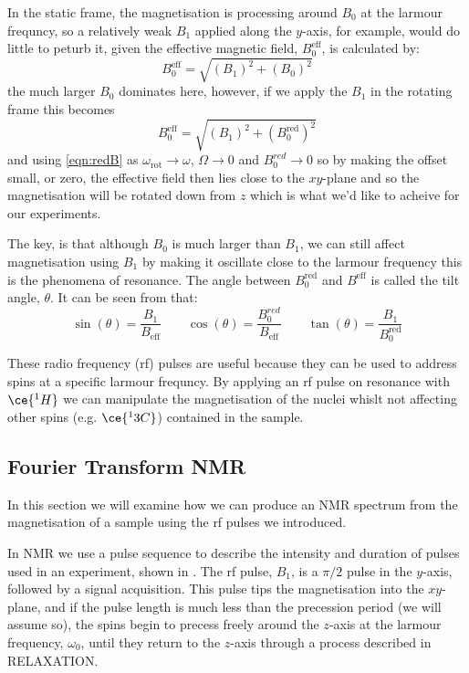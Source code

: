 In the static frame, the magnetisation is processing around $B_0$ at the larmour frequncy, so a relatively weak $B_1$ applied along the $y$-axis, for example, would do little to peturb it, given the effective magnetic field, $B^{\text{eff}}_0$, is calculated by:
\begin{equation}
  B^{\text{eff}}_0 = \sqrt{(B_1)^2+(B_0)^2}
\end{equation}
the much larger $B_0$ dominates here, however, if we apply the $B_1$ in the rotating
frame this becomes
\begin{equation}
  B^{\text{eff}}_0 = \sqrt{(B_1)^2+(B^{\text{red}}_0)^2}
\end{equation}
and using \ref{eqn:redB} as $\omega_{\text{rot}}\rightarrow\omega$, $\Omega\rightarrow0$ and $B^{red}_0\rightarrow0$ so by making the offset small, or zero, the effective field
then lies close to the $xy$-plane and so the magnetisation will be rotated down
from $z$ which is what we'd like to acheive for our experiments.

The key, is that although $B_0$ is much larger than $B_1$, we can still affect magnetisation using $B_1$ by making it oscillate close to the larmour frequency
this is the phenomena of resonance. The angle between $B^{\text{red}}_0$ and $B^{\text{eff}}$ is
called the tilt angle, $\theta$. It can be seen from  that:
\begin{equation}
\sin(\theta) = \frac{B_1}{B_{\text{eff}}}\qquad\cos(\theta) = \frac{B^{red}_0}{B_{\text{eff}}}\qquad\tan(\theta) = \frac{B_1}{B^{\text{red}}_0}
\end{equation}

These radio frequency (rf) pulses are useful because they can be used to address spins at a specific larmour
frequncy. By applying an rf pulse on resonance with $\ce{^1H}$ we can manipulate the magnetisation of the nuclei whislt not affecting other spins (e.g. $\ce{^13C}$) contained in the sample.

\subsection{Fourier Transform NMR}

In this section we will examine how we can produce an NMR spectrum from the magnetisation of a sample
using the rf pulses we introduced.

In NMR we use a pulse sequence to describe the intensity and duration of pulses used in an
experiment, shown in . The rf pulse, $B_1$, is a $\pi/2$ pulse in the $y$-axis, followed by a signal
acquisition. This pulse tips the magnetisation into the $xy$-plane, and if the pulse length is much less than the
precession period (we will assume so), the spins begin to precess freely around the $z$-axis at the larmour
frequency, $\omega_0$, until they return to the $z$-axis through a process described in RELAXATION.

